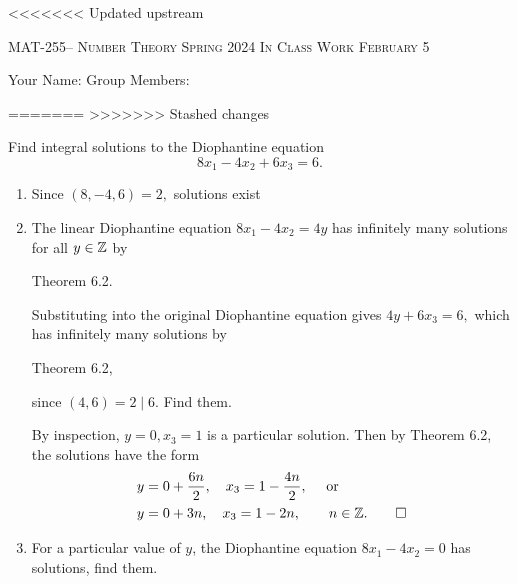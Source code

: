 \documentclass[handout]{ximera}
\date{February 5, 2024}
\date{\classday, 2024}
\begin{document}
\handoutAbstract
\maketitle
<<<<<<< Updated upstream
  \begin{center}%
    {\large \scshape MAT-255-- Number Theory \hfill Spring 2024 \hfill In Class Work February 5}%
    
    {\large
        Your Name: \hrulefill \quad Group Members:\hrulefill \quad \hrulefill
	\par}%
  \end{center}%
=======
>>>>>>> Stashed changes
  
\begin{br}
    Find integral solutions to the Diophantine equation \[8x_1-4x_2+6x_3=6.\]
    
    \begin{enumerate}
        \item Since $(8,-4,6)=2,$ solutions exist
        \item The linear Diophantine equation $8x_1-4x_2=4y$ has infinitely many solutions for all $y\in\mathbb Z$ by 
        \begin{freeResponse}
            Theorem 6.2.
        \end{freeResponse}
        \pdfOnly{\ifhandout{
            \rule{2 cm}{0.4pt}}
                \else
                \fi}
        Substituting into the original Diophantine equation gives $4y+6x_3=6,$ which has infinitely many solutions by 
        \begin{freeResponse}
            Theorem 6.2,
        \end{freeResponse}
        \pdfOnly{\ifhandout{
            \rule{2 cm}{0.4pt}}
                \else
                \fi}
        since $(4,6)=2\mid 6$. Find them.
         
        \begin{solution}
            By inspection, $y=0,x_3=1$ is a particular solution. Then by Theorem 6.2, the solutions have the form 
            \begin{align*}
                y&=0+\frac{6n}{2},\quad x_3=1-\frac{4n}{2}, \quad \textnormal{ or }\\
                y&=0+3n,\quad x_3=1-2n, \qquad n\in\mathbb Z. \qedhere
            \end{align*}
        \end{solution}
        \item  For a particular value of $y$, the Diophantine equation $8x_1-4x_2=0$ has solutions, find them. 
        

\end{enumerate}
\end{br}
\end{document}
